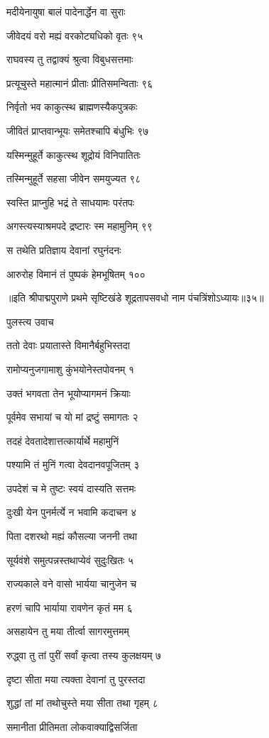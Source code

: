 मदीयेनायुषा बालं पादेनार्द्धेन वा सुराः

जीवेदयं वरो मह्यं वरकोट्यधिको वृतः ९५

राघवस्य तु तद्वाक्यं श्रुत्वा विबुधसत्तमाः

प्रत्यूचुस्ते महात्मानं प्रीताः प्रीतिसमन्विताः ९६

निर्वृतो भव काकुत्स्थ ब्राह्मणस्यैकपुत्रकः

जीवितं प्राप्तवान्भूयः समेतश्चापि बंधुभिः ९७

यस्मिन्मुहूर्ते काकुत्स्थ शूद्रोयं विनिपातितः

तस्मिन्मुहूर्ते सहसा जीवेन समयुज्यत ९८

स्वस्ति प्राप्नुहि भद्रं ते साधयामः परंतपः

अगस्त्यस्याश्रमपदे द्रष्टारः स्म महामुनिम् ९९

स तथेति प्रतिज्ञाय देवानां रघुनंदनः

आरुरोह विमानं तं पुष्पकं हेमभूषितम् १०० 

॥इति श्रीपाद्मपुराणे प्रथमे सृष्टिखंडे शूद्रतापसवधो नाम पंचत्रिंशोऽध्यायः॥३५॥


पुलस्त्य उवाच

ततो देवाः प्रयातास्ते विमानैर्बहुभिस्तदा

रामोप्यनुजगामाशु कुंभयोनेस्तपोवनम् १

उक्तं भगवता तेन भूयोप्यागमनं क्रियाः

पूर्वमेव सभायां च यो मां द्रष्टुं समागतः २

तदहं देवतादेशात्तत्कार्यार्थे महामुनिं

पश्यामि तं मुनिं गत्वा देवदानवपूजितम् ३

उपदेशं च मे तुष्टः स्वयं दास्यति सत्तमः

दुःखी येन पुनर्मर्त्ये न भवामि कदाचन ४

पिता दशरथो मह्यं कौसल्या जननी तथा

सूर्यवंशे समुत्पन्नस्तथाप्येवं सुदुःखितः ५

राज्यकाले वने वासो भार्यया चानुजेन च

हरणं चापि भार्याया रावणेन कृतं मम ६

असहायेन तु मया तीर्त्वा सागरमुत्तमम्

रुद्ध्वा तु तां पुरीं सर्वां कृत्वा तस्य कुलक्षयम् ७

दृष्टा सीता मया त्यक्ता देवानां तु पुरस्तदा

शुद्धां तां मां तथोचुस्ते मया सीता तथा गृहम् ८

समानीता प्रीतिमता लोकवाक्याद्विसर्जिता

